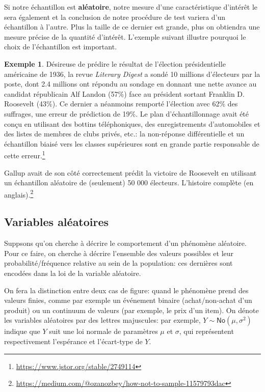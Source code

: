 \documentclass[
  11pt,
  letterpaper,
]{article}
\renewcommand{\href}[2]{#2\footnote{\url{#1}}}
\theoremstyle{definition}
\theoremstyle{definition}
\newtheorem{example}{Exemple}[section]
\theoremstyle{definition}
\theoremstyle{remark}
\begin{document}
Si notre échantillon est \textbf{aléatoire}, notre mesure d'une caractéristique d'intérêt le sera également et la conclusion de notre procédure de test variera d'un échantillon à l'autre. Plus la taille de ce dernier est grande, plus on obtiendra une mesure précise de la quantité d'intérêt. L'exemple suivant illustre pourquoi le choix de l'échantillon est important.

\begin{example}
\protect\hypertarget{exm:Galluppoll}{}{\label{exm:Galluppoll} }
Désireuse de prédire le résultat de l'élection présidentielle américaine de 1936, la revue \emph{Literary Digest} a sondé 10 millions d'électeurs par la poste, dont 2.4 millions ont répondu au sondage en donnant une nette avance au candidat républicain Alf Landon (57\%) face au président sortant Franklin D. Roosevelt (43\%). Ce dernier a néanmoins remporté l'élection avec 62\% des suffrages, une erreur de prédiction de 19\%. Le plan d'échantillonnage avait été conçu en utilisant des bottins téléphoniques, des enregistrements d'automobiles et des listes de membres de clubs privés, etc.: \href{https://www.jstor.org/stable/2749114}{la non-réponse différentielle et un échantillon biaisé vers les classes supérieures sont en grande partie responsable de cette erreur.}

Gallup avait de son côté correctement prédit la victoire de Roosevelt en utilisant un échantillon aléatoire de (seulement) 50 000 électeurs. \href{https://medium.com/@ozanozbey/how-not-to-sample-11579793dac}{L'histoire complète (en anglais).}
\end{example}

\hypertarget{variable-aleatoire}{%
\subsection{Variables aléatoires}\label{variable-aleatoire}}

Suppsons qu'on cherche à décrire le comportement d'un phénomène aléatoire. Pour ce faire, on cherche à décrire l'ensemble des valeurs possibles et leur probabilité/fréquence relative au sein de la population: ces dernières sont encodées dans la loi de la variable aléatoire.

On fera la distinction entre deux cas de figure: quand le phénomène prend des valeurs finies, comme par exemple un événement binaire (achat/non-achat d'un produit) ou un continuum de valeurs (par exemple, le prix d'un item). On dénote les variables aléatoires par des lettres majuscules: par exemple, \(Y \sim \mathsf{No}(\mu, \sigma^2)\) indique que \(Y\) suit une loi normale de paramètres \(\mu\) et \(\sigma\), qui représentent respectivement l'espérance et l'écart-type de \(Y\).
\end{document}
